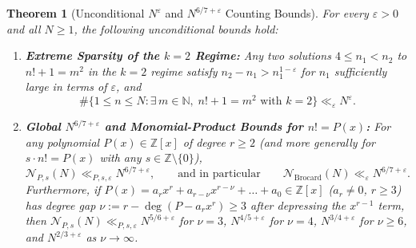 \documentclass[11pt,reqno]{amsart}
\newtheorem{theorem}{Theorem}[section]
\theoremstyle{remark}
\numberwithin{equation}{section}
\newcommand{\N}{\mathbb{N}}
\newcommand{\Z}{\mathbb{Z}}
\begin{document}
\begin{theorem}[{Unconditional $N^\varepsilon$ and $N^{6/7+\varepsilon}$ Counting Bounds}]\label{thm:1.3}
For every $\varepsilon > 0$ and all $N \ge 1$, the following unconditional bounds hold:
\begin{enumerate}
\item[(i)] \textbf{Extreme Sparsity of the $k = 2$ Regime:} Any two solutions $4 \le n_1 < n_2$ to $n! + 1 = m^2$ in the $k = 2$ regime satisfy $n_2 - n_1 > n_1^{1-\varepsilon}$ for $n_1$ sufficiently large in terms of $\varepsilon$, and
\begin{equation}\label{eq:1.9}
\#\bigl\{1 \le n \le N : \exists\, m \in \N,\; n! + 1 = m^2 \text{ with } k = 2\bigr\} \ll_\varepsilon N^\varepsilon.
\end{equation}
\item[(ii)] \textbf{Global $N^{6/7+\varepsilon}$ and Monomial-Product Bounds for $n! = P(x)$:} For any polynomial $P(x) \in \Z[x]$ of degree $r \ge 2$ (and more generally for $s \cdot n! = P(x)$ with any $s \in \Z \setminus \{0\}$),
\begin{equation}\label{eq:1.10}
\mathcal{N}_{P,s}(N) \ll_{P,s,\varepsilon} N^{6/7+\varepsilon}, \qquad \text{and in particular} \qquad \mathcal{N}_{\mathrm{Brocard}}(N) \ll_\varepsilon N^{6/7+\varepsilon}.
\end{equation}
Furthermore, if $P(x) = a_r x^r + a_{r-\nu} x^{r-\nu} + \dots + a_0 \in \Z[x]$ ($a_r \ne 0$, $r \ge 3$) has degree gap $\nu := r - \deg(P - a_r x^r) \ge 3$ after depressing the $x^{r-1}$ term, then $\mathcal{N}_{P,s}(N) \ll_{P,s,\varepsilon} N^{5/6+\varepsilon}$ for $\nu = 3$, $N^{4/5+\varepsilon}$ for $\nu = 4$, $N^{3/4+\varepsilon}$ for $\nu \ge 6$, and $N^{2/3+\varepsilon}$ as $\nu \to \infty$.
\end{enumerate}
\end{theorem}
\end{document}
